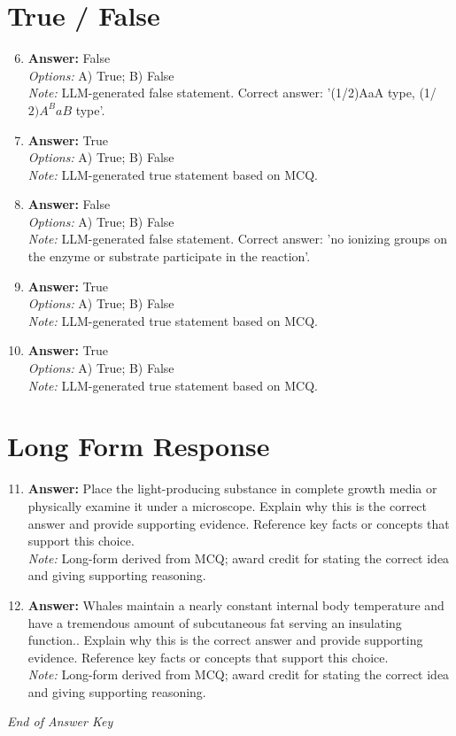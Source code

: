 \documentclass[12pt]{article}
\begin{document}
\section*{True / False}
\begin{enumerate}[label=\arabic*.]
\setcounter{enumi}{5}
\item \textbf{Answer:} False
\\ \textit{Options:} A) True; B) False
\\ \textit{Note:} LLM-generated false statement. Correct answer: '(1/2)AaA type, (1/$2)A^BaB$ type'.
\item \textbf{Answer:} True
\\ \textit{Options:} A) True; B) False
\\ \textit{Note:} LLM-generated true statement based on MCQ.
\item \textbf{Answer:} False
\\ \textit{Options:} A) True; B) False
\\ \textit{Note:} LLM-generated false statement. Correct answer: 'no ionizing groups on the enzyme or substrate participate in the reaction'.
\item \textbf{Answer:} True
\\ \textit{Options:} A) True; B) False
\\ \textit{Note:} LLM-generated true statement based on MCQ.
\item \textbf{Answer:} True
\\ \textit{Options:} A) True; B) False
\\ \textit{Note:} LLM-generated true statement based on MCQ.
\end{enumerate}

\section*{Long Form Response}
\begin{enumerate}[label=\arabic*.]
\setcounter{enumi}{10}
\item \textbf{Answer:} Place the light-producing substance in complete growth media or physically examine it under a microscope. Explain why this is the correct answer and provide supporting evidence. Reference key facts or concepts that support this choice.
\\ \textit{Note:} Long-form derived from MCQ; award credit for stating the correct idea and giving supporting reasoning.
\item \textbf{Answer:} Whales maintain a nearly constant internal body temperature and have a tremendous amount of subcutaneous fat serving an insulating function.. Explain why this is the correct answer and provide supporting evidence. Reference key facts or concepts that support this choice.
\\ \textit{Note:} Long-form derived from MCQ; award credit for stating the correct idea and giving supporting reasoning.
\end{enumerate}

\vfill
\noindent\textit{End of Answer Key}
\end{document}
